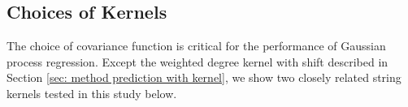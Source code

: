 \documentclass{scrartcl}[2013/05/29]%
\begin{document}


\subsection{Choices of Kernels}
\label{sec: Choices of Kernels}

The choice of covariance function is critical for the performance of Gaussian process regression. 
Except the weighted degree kernel with shift described in Section \ref{sec: method prediction with kernel}, we show two closely related string kernels tested in this study below.
\end{document}
